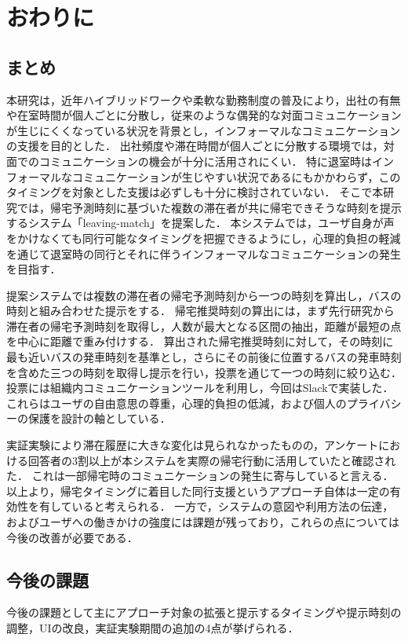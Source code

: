 \chapter{おわりに}
\thispagestyle{myheadings}

\section{まとめ}
本研究は，近年ハイブリッドワークや柔軟な勤務制度の普及により，出社の有無や在室時間が個人ごとに分散し，従来のような偶発的な対面コミュニケーションが生じにくくなっている状況を背景とし，インフォーマルなコミュニケーションの支援を目的とした．
出社頻度や滞在時間が個人ごとに分散する環境では，対面でのコミュニケーションの機会が十分に活用されにくい．
特に退室時はインフォーマルなコミュニケーションが生じやすい状況であるにもかかわらず，このタイミングを対象とした支援は必ずしも十分に検討されていない．
そこで本研究では，帰宅予測時刻に基づいた複数の滞在者が共に帰宅できそうな時刻を提示するシステム「leaving-match」を提案した．
本システムでは，ユーザ自身が声をかけなくても同行可能なタイミングを把握できるようにし，心理的負担の軽減を通じて退室時の同行とそれに伴うインフォーマルなコミュニケーションの発生を目指す．


提案システムでは複数の滞在者の帰宅予測時刻から一つの時刻を算出し，バスの時刻と組み合わせた提示をする．
帰宅推奨時刻の算出には，まず先行研究から滞在者の帰宅予測時刻を取得し，人数が最大となる区間の抽出，距離が最短の点を中心に距離で重み付けする．
算出された帰宅推奨時刻に対して，その時刻に最も近いバスの発車時刻を基準とし，さらにその前後に位置するバスの発車時刻を含めた三つの時刻を取得し提示を行い，投票を通じて一つの時刻に絞り込む．
投票には組織内コミュニケーションツールを利用し，今回はSlackで実装した．
これらはユーザの自由意思の尊重，心理的負担の低減，および個人のプライバシーの保護を設計の軸としている．


実証実験により滞在履歴に大きな変化は見られなかったものの，アンケートにおける回答者の3割以上が本システムを実際の帰宅行動に活用していたと確認された．
これは一部帰宅時のコミュニケーションの発生に寄与していると言える．
以上より，帰宅タイミングに着目した同行支援というアプローチ自体は一定の有効性を有していると考えられる．
一方で，システムの意図や利用方法の伝達，およびユーザへの働きかけの強度には課題が残っており，これらの点については今後の改善が必要である．


\section{今後の課題}
今後の課題として主にアプローチ対象の拡張と提示するタイミングや提示時刻の調整，UIの改良，実証実験期間の追加の4点が挙げられる．

